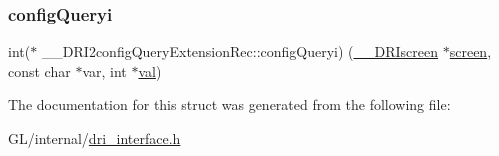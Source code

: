 \mbox{\label{struct_____d_r_i2config_query_extension_rec_ac38edb5fe4f517fb1b391d349c0ec4f6}} 
\subsubsection{\texorpdfstring{config\+Queryi}{configQueryi}}
{\footnotesize\ttfamily int($\ast$ \+\_\+\+\_\+\+D\+R\+I2config\+Query\+Extension\+Rec\+::config\+Queryi) (\hyperlink{dri__interface_8h_a9961b01d421ee1fd6ed3c05acc9ca561}{\+\_\+\+\_\+\+D\+R\+Iscreen} $\ast$\hyperlink{cad_8h_ae04e09e4e3831bfc1632c509ae37dcec}{screen}, const char $\ast$var, int $\ast$\hyperlink{glcorearb_8h_a26942fd2ed566ef553eae82d2c109c8f}{val})}



The documentation for this struct was generated from the following file\+:\begin{DoxyCompactItemize}
\item 
G\+L/internal/\hyperlink{dri__interface_8h}{dri\+\_\+interface.\+h}\end{DoxyCompactItemize}

